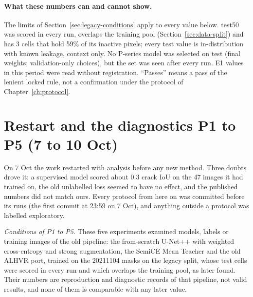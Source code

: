 \paragraph{What these numbers can and cannot show.} The limits of Section~\ref{sec:legacy-conditions} apply to every value below.
test50 was scored in every run, overlaps the training pool (Section~\ref{sec:data-split}) and has 3 cells that hold 59\% of its
inactive pixels; every test value is in-distribution with known leakage, context only. No P-series model was selected on test
(final weights; validation-only choices), but the set was seen after every run. E1 values in this period were read without
registration. ``Passes'' means a pass of the lenient locked rule, not a confirmation under the protocol of Chapter~\ref{ch:protocol}.

\section{Restart and the diagnostics P1 to P5 (7 to 10 Oct)}\label{sec:pseries-diag}

On 7 Oct the work restarted with analysis before any new method. Three doubts drove it: a supervised model scored about 0.3 crack
IoU on the 47 images it had trained on, the old unlabelled loss seemed to have no effect, and the published numbers did not match
ours. Every protocol from here on was committed before its runs (the first commit at 23:59 on 7 Oct), and anything outside a
protocol was labelled exploratory.

\emph{Conditions of P1 to P5.} These five experiments examined models, labels or training images of the old pipeline: the from-scratch U-Net++ with
weighted cross-entropy and strong augmentation, the SemiCE Mean Teacher and the old ALHVR port, trained on the 20211104 masks on
the legacy split, whose test cells were scored in every run and which overlaps the training pool, as later found. Their numbers are
reproduction and diagnostic records of that pipeline, not valid results, and none of them is comparable with any later value.

